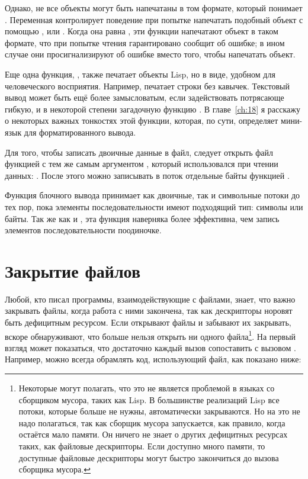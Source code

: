 Однако, не все объекты могут быть напечатаны в том формате, который понимает
. Переменная  контролирует поведение при попытке
напечатать подобный объект с помощью ,  или . Когда
она равна , эти функции напечатают объект в таком формате, что  при
попытке чтения гарантировано сообщит об ошибке; в ином случае они просигнализируют об
ошибке вместо того, чтобы напечатать объект.

Еще одна функция, , также печатает объекты Lisp, но в виде, удобном для
человеческого восприятия. Например,  печатает строки без кавычек. Текстовый
вывод может быть ещё более замысловатым, если задействовать потрясающе гибкую, и в
некоторой степени загадочную функцию . В главе~\ref{ch:18} я расскажу о
некоторых важных тонкостях этой функции, которая, по сути, определяет мини-язык для
форматированного вывода.

Для того, чтобы записать двоичные данные в файл, следует открыть файл функцией 
с тем же самым аргументом , который использовался при чтении данных:
. После этого можно записывать в поток отдельные байты функцией
.

Функция блочного вывода  принимает как двоичные, так и символьные
потоки до тех пор, пока элементы последовательности имеют подходящий тип: символы или
байты. Так же как и , эта функция наверняка более эффективна, чем
запись элементов последовательности поодиночке.

\section{Закрытие файлов}

Любой, кто писал программы, взаимодействующие с файлами, знает, что важно закрывать файлы,
когда работа с ними закончена, так как дескрипторы норовят быть дефицитным ресурсом. Если
открывают файлы и забывают их закрывать, вскоре обнаруживают, что больше нельзя открыть ни
одного файла\footnote{Некоторые могут полагать, что это не является проблемой в языках со
  сборщиком мусора, таких как Lisp. В большинстве реализаций Lisp все потоки, которые
  больше не нужны, автоматически закрываются. Но на это не надо полагаться, так как
  сборщик мусора запускается, как правило, когда остаётся мало памяти. Он ничего не знает
  о других дефицитных ресурсах таких, как файловые дескрипторы. Если доступно много
  памяти, то доступные файловые дескрипторы могут быстро закончиться до вызова сборщика
  мусора.}. На первый взгляд может показаться, что достаточно каждый вызов 
сопоставить с вызовом . Например, можно всегда обрамлять код, использующий
файл, как показано ниже:

